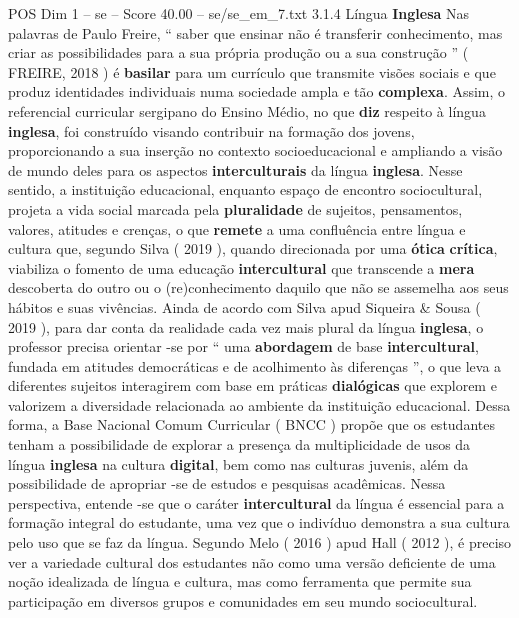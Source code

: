 \begin{textsample}{POS Dim 1 – se – Score 40.00 – se/se\_em\_7.txt}  \label{ex:f1_pos_090}
3.1.4 Língua \textbf{Inglesa} Nas palavras de Paulo Freire, “ saber que ensinar não é transferir conhecimento, mas criar as possibilidades para a sua própria produção ou a sua construção ” ( FREIRE, 2018 ) é \textbf{basilar} para um currículo que transmite visões sociais e que produz identidades individuais numa sociedade ampla e tão \textbf{complexa}.
Assim, o referencial curricular sergipano do Ensino Médio, no que \textbf{diz} respeito à língua \textbf{inglesa}, foi construído visando contribuir na formação dos jovens, proporcionando a sua inserção no contexto socioeducacional e ampliando a visão de mundo deles para os aspectos \textbf{interculturais} da língua \textbf{inglesa}.
Nesse sentido, a instituição educacional, enquanto espaço de encontro sociocultural, projeta a vida social marcada pela \textbf{pluralidade} de sujeitos, pensamentos, valores, atitudes e crenças, o que \textbf{remete} a uma confluência entre língua e cultura que, segundo Silva ( 2019 ), quando direcionada por uma \textbf{ótica} \textbf{crítica}, viabiliza o fomento de uma educação \textbf{intercultural} que transcende a \textbf{mera} descoberta do outro ou o (re)conhecimento daquilo que não se assemelha aos seus hábitos e suas vivências.
Ainda de acordo com Silva apud Siqueira \& Sousa ( 2019 ), para dar conta da realidade cada vez mais plural da língua \textbf{inglesa}, o professor precisa orientar -se por “ uma \textbf{abordagem} de base \textbf{intercultural}, fundada em atitudes democráticas e de acolhimento às diferenças ”, o que leva a diferentes sujeitos interagirem com base em práticas \textbf{dialógicas} que explorem e valorizem a diversidade relacionada ao ambiente da instituição educacional.
Dessa forma, a Base Nacional Comum Curricular ( BNCC ) propõe que os estudantes tenham a possibilidade de explorar a presença da multiplicidade de usos da língua \textbf{inglesa} na cultura \textbf{digital}, bem como nas culturas juvenis, além da possibilidade de apropriar -se de estudos e pesquisas acadêmicas.
Nessa perspectiva, entende -se que o caráter \textbf{intercultural} da língua é essencial para a formação integral do estudante, uma vez que o indivíduo demonstra a sua cultura pelo uso que se faz da língua.
Segundo Melo ( 2016 ) apud Hall ( 2012 ), é preciso ver a variedade cultural dos estudantes não como uma versão deficiente de uma noção idealizada de língua e cultura, mas como ferramenta que permite sua participação em diversos grupos e comunidades em seu mundo sociocultural.

\end{textsample}
